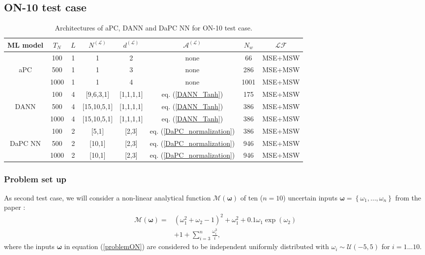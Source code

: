 \documentclass[a4paper,fleqn]{article}
\begin{document}
\subsection{ON-10 test case}
\label{OladyshkinNowak}
%
\begin{table}[!htb]
\caption{Architectures of aPC, DANN and DaPC NN for ON-10 test case.}
\label{ONTestCase}       
\begin{tabular}{| c | c |c | c | c | c | c | c |}
    \hline
    ML model & $T_N$ & $L$ & $N^{(\mathcal{L})}$ & $d^{(\mathcal{L})}$ & $\mathcal{A}^{(\mathcal{L})}$ & $N_w$ & $\mathcal{LF}$\\
    \hline \hline 
    &100 & 1 & 1 & 2 & none & 66 & MSE+MSW\\
    aPC &500 & 1 & 1 & 3 & none & 286 & MSE+MSW\\
    &1000  & 1 & 1 & 4 & none & 1001 & MSE+MSW\\
    \hline
    & 100 & 4 & [9,6,3,1] & [1,1,1,1] & eq. (\ref{DANN_Tanh}) & 175 & MSE+MSW\\
    DANN & 500 & 4 & [15,10,5,1] & [1,1,1,1] & eq. (\ref{DANN_Tanh}) & 386 & MSE+MSW\\
    & 1000 & 4 & [15,10,5,1] & [1,1,1,1] & eq. (\ref{DANN_Tanh}) & 386 & MSE+MSW\\
    \hline
    & 100 & 2 & [5,1] & [2,3] & eq. (\ref{DaPC_normalization}) & 386 & MSE+MSW\\
    DaPC NN & 500 & 2 & [10,1] & [2,3] & eq. (\ref{DaPC_normalization}) & 946 & MSE+MSW\\
    & 1000 & 2 & [10,1] & [2,3]  & eq. (\ref{DaPC_normalization}) & 946  & MSE+MSW\\
    \hline
\end{tabular}
\end{table}
%

\subsubsection{Problem set up}
\label{SetUpON}

As second test case, we will consider a non-linear analytical function $\mathcal{M}(\bm{\omega})$ of ten ($n=10$) uncertain inputs $\bm{\omega}=\left\{\omega_1,\ldots,\omega_n \right\}$ from the paper \cite{oladyshkin2019connection}:
%
\begin{equation}
\label{problemON}
\begin{aligned}
\mathcal{M}(\bm{\omega})=&(\omega_1^2+\omega_2-1)^2+\omega_1^2+0.1\omega_1\exp(\omega_2)\\
&+1+\sum_{i=3}^{n}\frac{\omega_i^3}{i},
\end{aligned}
\end{equation}
%
where the inputs $\bm{\omega}$ in equation (\ref{problemON}) are considered to be independent uniformly distributed with $\omega_i\sim\mathcal{U}(-5,5)$ for $i=1 \ldots 10$. 
\end{document}
